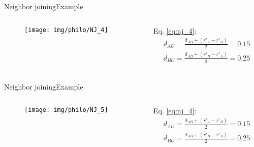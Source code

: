 \documentclass[10pt]{beamer}
\newcommand{\1}{
	\setbeamertemplate{background}{
		\texttt{[image: img/1]}
		\tikz[overlay] \fill[fill opacity=0.75,fill=white] (0,0) rectangle (-\paperwidth,\paperheight);
	}
}
\begin{document}
\begin{frame}{Neighbor joining}{Example}
	\begin{columns}
		\begin{column}{0.48\textwidth}
			\begin{figure}
				\texttt{[image: img/philo/NJ\_4]}
			\end{figure}
		\end{column}
		\begin{column}{0.48\textwidth}
			Eq. \ref{eq:nj_4}:
			\begin{equation*}
				\begin{split}				
					d_{AU} = \frac{ d_{AB} + ( r'_A - r'_B ) }{2} = 0.15 \\
					d_{BU} = \frac{ d_{AB} + ( r'_B - r'_A ) }{2} = 0.25 \\
				\end{split}
			\end{equation*} 	
		\end{column}
	\end{columns}
\end{frame}


\begin{frame}{Neighbor joining}{Example}
	\begin{columns}
		\begin{column}{0.48\textwidth}
			\begin{figure}
				\texttt{[image: img/philo/NJ\_5]}
			\end{figure}
		\end{column}
		\begin{column}{0.48\textwidth}
			Eq. \ref{eq:nj_4}:
			\begin{equation*}
			\begin{split}				
			d_{AU} = \frac{ d_{AB} + ( r'_A - r'_B ) }{2} = 0.15 \\
			d_{BU} = \frac{ d_{AB} + ( r'_B - r'_A ) }{2} = 0.25 \\
			\end{split}
			\end{equation*} 	
		\end{column}
	\end{columns}
\end{frame}
\end{document}
